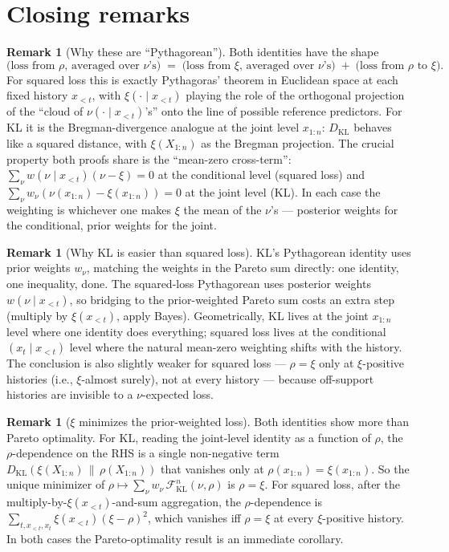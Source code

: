 \documentclass[fontsize=11pt, parskip=half]{scrartcl}
\theoremstyle{definition}
\newtheorem{remark}[theorem]{Remark}
\newcommand{\KL}{D_{\text{KL}}}
\newcommand{\FKL}{\mathcal{F}_{\text{KL}}}
\begin{document}
\section*{Closing remarks}

\begin{remark}[Why these are ``Pythagorean'']
Both identities have the shape
\[
  \text{(loss from $\rho$, averaged over $\nu$'s)}
  \;=\;
  \text{(loss from $\xi$, averaged over $\nu$'s)} \;+\;
  \text{(loss from $\rho$ to $\xi$).}
\]
For squared loss this is exactly Pythagoras' theorem in Euclidean space at
each fixed history $x_{<t}$, with $\xi(\cdot \mid x_{<t})$ playing the role
of the orthogonal projection of the ``cloud of $\nu(\cdot \mid x_{<t})$'s''
onto the line of possible reference predictors. For KL it is the Bregman-divergence
analogue at the joint level $x_{1:n}$: $\KL$ behaves like a squared distance,
with $\xi(X_{1:n})$ as the Bregman projection. The crucial property both
proofs share is the ``mean-zero cross-term'': $\sum_\nu w(\nu \mid x_{<t})
(\nu - \xi) = 0$ at the conditional level (squared loss) and $\sum_\nu w_\nu
(\nu(x_{1:n}) - \xi(x_{1:n})) = 0$ at the joint level (KL). In each case the
weighting is whichever one makes $\xi$ the mean of the $\nu$'s --- posterior
weights for the conditional, prior weights for the joint.
\end{remark}

\begin{remark}[Why KL is easier than squared loss]
KL's Pythagorean identity uses prior weights $w_\nu$, matching the weights in
the Pareto sum directly: one identity, one inequality, done. The squared-loss
Pythagorean uses posterior weights $w(\nu \mid x_{<t})$, so bridging to the
prior-weighted Pareto sum costs an extra step (multiply by $\xi(x_{<t})$, apply
Bayes). Geometrically, KL lives at the joint $x_{1:n}$ level where one
identity does everything; squared loss lives at the conditional $(x_t \mid
x_{<t})$ level where the natural mean-zero weighting shifts with the history.
The conclusion is also slightly weaker for squared loss --- $\rho = \xi$ only
at $\xi$-positive histories (i.e., $\xi$-almost surely), not at every history
--- because off-support histories are invisible to a $\nu$-expected loss.
\end{remark}

\begin{remark}[$\xi$ minimizes the prior-weighted loss]
Both identities show more than Pareto optimality. For KL, reading the
joint-level identity as a function of $\rho$, the $\rho$-dependence on the
RHS is a single non-negative term $\KL(\xi(X_{1:n}) \,\|\, \rho(X_{1:n}))$
that vanishes only at $\rho(x_{1:n}) = \xi(x_{1:n})$. So the unique minimizer
of $\rho \mapsto \sum_\nu w_\nu \,\FKL^n(\nu, \rho)$ is $\rho = \xi$. For
squared loss, after the multiply-by-$\xi(x_{<t})$-and-sum aggregation, the
$\rho$-dependence is $\sum_{t,x_{<t},x_t} \xi(x_{<t})(\xi - \rho)^2$, which
vanishes iff $\rho = \xi$ at every $\xi$-positive history. In both cases the
Pareto-optimality result is an immediate corollary.
\end{remark}
\end{document}
